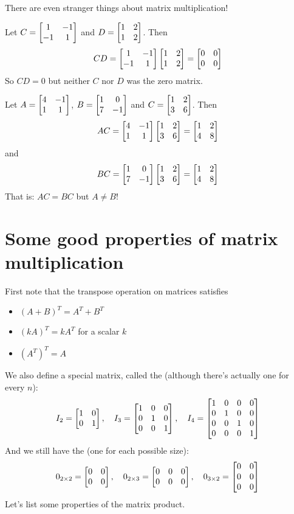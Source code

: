 There are even stranger things about matrix multiplication!

\begin{myexample}
Let $C = \mat{1 & -1\\-1&1}$ and $D = \mat{1 & 2\\ 1& 2}$.  Then
$$
CD =  \mat{1 & -1\\-1&1} \mat{1 & 2\\ 1& 2} = \mat{0&0\\0&0}
$$
So $CD = 0$ but neither $C$ nor $D$ was the zero matrix.
\end{myexample}


\begin{myexample}
Let $A = \mat{4 & -1\\ 1 & 1}$, $B = \mat{1 & 0 \\ 7 & -1}$ and $C = \mat{1 & 2\\ 3 & 6}$.  Then
$$
AC = \mat{4 & -1\\ 1 & 1}\mat{1 & 2\\ 3 & 6} = \mat{1&2\\ 4&8}
$$
and
$$
BC = \mat{1 & 0 \\ 7 & -1}\mat{1 & 2\\ 3 & 6} = \mat{1 & 2\\ 4& 8}
$$
That is:  $AC = BC$ but $A \neq B$!  \end{myexample}



\section{Some good properties of matrix multiplication}

First note that the transpose operation on matrices satisfies
\begin{itemize}
\item $(A+B)^T = A^T + B^T$
\item $(kA)^T = kA^T$ for a scalar $k$
\item $(A^T)^T = A$
\end{itemize}
We also define a special matrix, called the  (although
there's actually one for every $n$):
$$
I_2 = \mat{1&0\\0&1}, \quad I_3 = \mat{1&0&0\\0&1&0\\0&0&1}, \quad
I_4 = \mat{1&0&0&0\\0&1&0&0\\0&0&1&0\\0&0&0&1}
$$
And we still have the  (one for each possible size):
$$
0_{2\times 2} = \mat{0&0\\0&0}, \quad 0_{2\times3}= \mat{0&0&0\\0&0&0},
\quad 0_{3\times 2} = \mat{0&0\\0&0\\0&0}
$$
Let's list some properties of the matrix product.  

